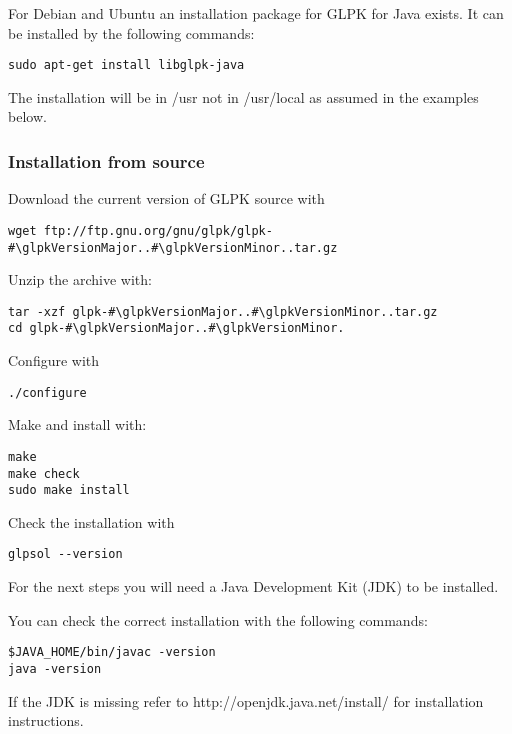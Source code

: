 \documentclass[a4paper,11pt]{report}
\newcommand{\glpkVersionMajor}{4}
\newcommand{\glpkVersionMinor}{61}
\begin{document}
For Debian and Ubuntu an installation package for GLPK for Java exists.
It can be installed by the following commands:

\begin{lstlisting}
sudo apt-get install libglpk-java
\end{lstlisting}

The installation will be in /usr not in /usr/local as assumed in the examples
below.

\subsubsection{Installation from source}

Download the current version of GLPK source with

\begin{lstlisting}
wget ftp://ftp.gnu.org/gnu/glpk/glpk-#\glpkVersionMajor..#\glpkVersionMinor..tar.gz
\end{lstlisting}

Unzip the archive with:

\begin{lstlisting}
tar -xzf glpk-#\glpkVersionMajor..#\glpkVersionMinor..tar.gz
cd glpk-#\glpkVersionMajor..#\glpkVersionMinor.
\end{lstlisting}

Configure with

\begin{lstlisting}
./configure
\end{lstlisting}

Make and install with:

\begin{lstlisting}
make
make check
sudo make install
\end{lstlisting}

Check the installation with

\begin{lstlisting}
glpsol --version
\end{lstlisting}

For the next steps you will need a Java Development Kit (JDK) to be installed.

You can check the correct installation with the following commands:

\begin{lstlisting}
$JAVA_HOME/bin/javac -version
java -version
\end{lstlisting}

If the JDK is missing refer to http://openjdk.java.net/install/ for
installation instructions.
\end{document}
